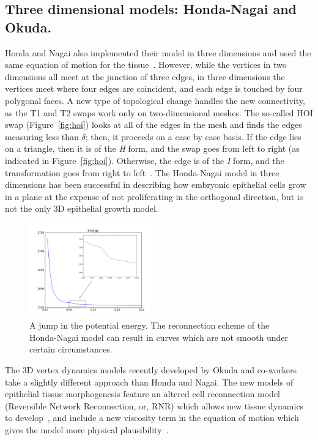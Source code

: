 \subsection{Three dimensional models: Honda-Nagai and Okuda.}
Honda and Nagai also implemented their model in three dimensions and used the same equation of motion for the tissue~\cite{Honda3D}. However, while the vertices in two dimensions all meet at the junction of three edges,  in three dimensions the vertices meet where four edges are coincident, and each edge is touched by four polygonal faces. A new type of topological change handles the new connectivity, as the T1 and T2 swaps work only on two-dimensional meshes. The so-called HOI swap (Figure~\ref{fig:hoi}) looks at all of the edges in the mesh and finds the edges measuring less than $\delta$; then, it proceeds on a case by case basis. If the edge lies on a triangle, then it is of the \emph{H} form, and the swap goes from left to right (as indicated in Figure~\ref{fig:hoi}). Otherwise, the edge is of the \emph{I} form, and the transformation goes from right to left~\cite{Honda3D}. The Honda-Nagai model in three dimensions has been successful in describing how embryonic epithelial cells grow in a plane at the expense of not proliferating in the orthogonal direction, but is not the only 3D epithelial growth model.
\begin{figure}
  \begin{center}
    \includegraphics[width=0.48\textwidth]{../diagrams/jump.png}
  \end{center}
\caption[A non-smooth energy curve.]{A jump in the potential energy. The reconnection scheme of the Honda-Nagai model can 
result in curves which are not smooth under certain circumstances.}
\label{fig:jump}
\end{figure}
The 3D vertex dynamics models recently developed by Okuda and co-workers take a slightly different approach than Honda and Nagai. The new models of epithelial tissue morphogenesis feature an altered cell reconnection model (Reversible Network Reconnection, or, RNR) which allows new tissue dynamics to develop~\cite{Okuda1}, and include a new viscosity term in the equation of motion which gives the model more physical plausibility~\cite{Okuda3}.

